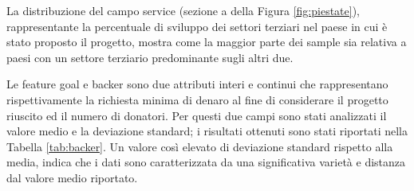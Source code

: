 \begin{figure}%
	\centering
	\qquad
	\caption{}%
	\label{fig:piecategory}%
\end{figure}

La distribuzione del campo service (sezione a della Figura \ref{fig:piestate}), rappresentante la percentuale di sviluppo dei settori terziari nel paese in cui è stato proposto il progetto, mostra come la maggior parte dei sample sia relativa a paesi con un settore terziario predominante sugli altri due.   


Le feature goal e backer sono due attributi interi e continui che rappresentano rispettivamente la richiesta minima di denaro al fine di considerare il progetto riuscito ed il numero di donatori. Per questi due campi sono stati analizzati il valore medio e la deviazione standard; i risultati ottenuti sono stati riportati nella Tabella \ref{tab:backer}. Un valore così elevato di deviazione standard rispetto alla media, indica che i dati sono caratterizzata da una significativa varietà e distanza dal valore medio riportato.

